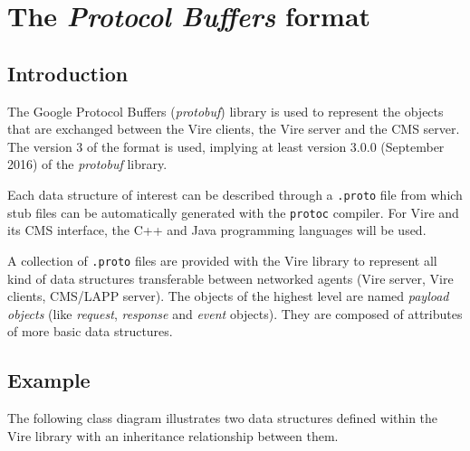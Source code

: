 
\section{The \emph{Protocol Buffers} format}\label{app:protobuf_fmt}

\subsection{Introduction}

The  Google  Protocol Buffers  (\emph{protobuf})  library  is used  to
represent the objects that are exchanged between the Vire clients, the
Vire server and the CMS server.  The  version 3 of the format is used,
implying   at   least   version   3.0.0  (September   2016)   of   the
\emph{protobuf} library.

Each  data   structure  of  interest   can  be  described   through  a
\texttt{.proto}  file  from  which  stub files  can  be  automatically
generated  with the  \texttt{protoc} compiler.  For Vire  and its  CMS
interface, the C++ and Java programming languages will be used.


A  collection of  \texttt{.proto}  files are  provided  with the  Vire
library to represent all kind  of data structures transferable between
networked agents  (Vire server,  Vire clients, CMS/LAPP  server).  The
objects of  the highest level  are named \emph{payload  objects} (like
\emph{request},  \emph{response} and  \emph{event} objects).   They
are composed of attributes of more basic data structures.

\subsection{Example}

The following  class diagram  illustrates two data  structures defined
within the Vire library with an inheritance relationship between them.

\begin{center}
\end{center}

